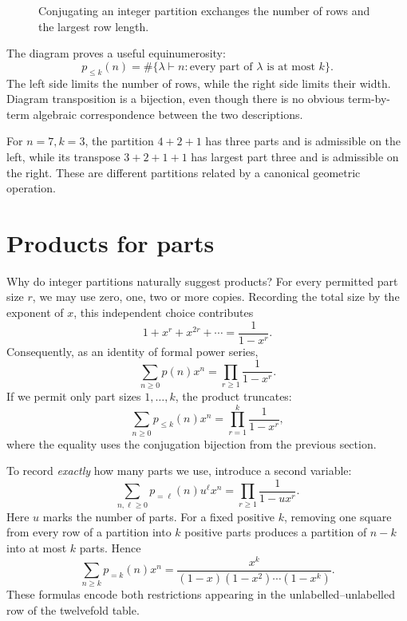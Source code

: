 \begin{figure}[htbp]
\centering
{}
\caption{Conjugating an integer partition exchanges the number of rows and the largest row length.}
\end{figure}

The diagram proves a useful equinumerosity:
\[
 \boxed{p_{\le k}(n)=
 \#\{\lambda\vdash n:\text{every part of }\lambda\text{ is at most }k\}.}
\]
The left side limits the number of rows, while the right side limits their width. Diagram transposition is a bijection, even though there is no obvious term-by-term algebraic correspondence between the two descriptions.

For \(n=7,k=3\), the partition \(4+2+1\) has three parts and is admissible on the left, while its transpose \(3+2+1+1\) has largest part three and is admissible on the right. These are different partitions related by a canonical geometric operation.

\section{Products for parts}

Why do integer partitions naturally suggest products? For every permitted part size \(r\), we may use zero, one, two or more copies. Recording the total size by the exponent of \(x\), this independent choice contributes
\[
 1+x^r+x^{2r}+\cdots=\frac1{1-x^r}.
\]
Consequently, as an identity of formal power series,
\[
 \boxed{\sum_{n\ge0}p(n)x^n
       =\prod_{r\ge1}\frac1{1-x^r}.}
\]
If we permit only part sizes \(1,\ldots,k\), the product truncates:
\[
 \sum_{n\ge0}p_{\le k}(n)x^n
 =\prod_{r=1}^k\frac1{1-x^r},
\]
where the equality uses the conjugation bijection from the previous section.

To record \emph{exactly} how many parts we use, introduce a second variable:
\[
 \boxed{\sum_{n,\ell\ge0}p_{=\ell}(n)u^\ell x^n
  =\prod_{r\ge1}\frac1{1-u x^r}.}
\]
Here \(u\) marks the number of parts. For a fixed positive \(k\), removing one square from every row of a partition into \(k\) positive parts produces a partition of \(n-k\) into at most \(k\) parts. Hence
\[
 \sum_{n\ge k}p_{=k}(n)x^n
 =\frac{x^k}{(1-x)(1-x^2)\cdots(1-x^k)}.
\]
These formulas encode both restrictions appearing in the unlabelled--unlabelled row of the twelvefold table.

